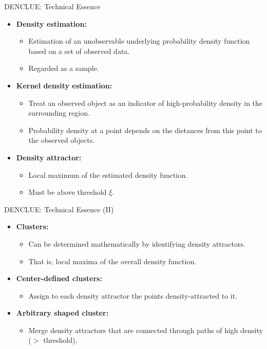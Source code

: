 \begin{frame}{DENCLUE: Technical Essence}
	\begin{itemize}
		\item \textbf{Density estimation:}
		      \begin{itemize}
			      \item Estimation of an unobservable underlying probability density
			            function based on a set of observed data.
			      \item Regarded as a sample.
		      \end{itemize}
		\item \textbf{Kernel density estimation:}
		      \begin{itemize}
			      \item Treat an observed object as an indicator of high-probability
			            density in the surrounding region.
			      \item Probability density at a point depends on the distances from
			            this point to the observed objects.
		      \end{itemize}
		\item \textbf{Density attractor:}
		      \begin{itemize}
			      \item Local maximum of the estimated density function.
			      \item Must be above threshold $\xi$.
		      \end{itemize}
	\end{itemize}
\end{frame}

\begin{frame}{DENCLUE: Technical Essence (II)}
	\begin{itemize}
		\item \textbf{Clusters:}
		      \begin{itemize}
			      \item Can be determined mathematically by identifying density
			            attractors.
			      \item That is, local maxima of the overall density function.
		      \end{itemize}
		\item \textbf{Center-defined clusters:}
		      \begin{itemize}
			      \item Assign to each density attractor the points density-attracted
			            to it.
		      \end{itemize}
		\item \textbf{Arbitrary shaped cluster:}
		      \begin{itemize}
			      \item Merge density attractors that are connected through paths of
			            high density ($>$ threshold).
		      \end{itemize}
	\end{itemize}
\end{frame}

